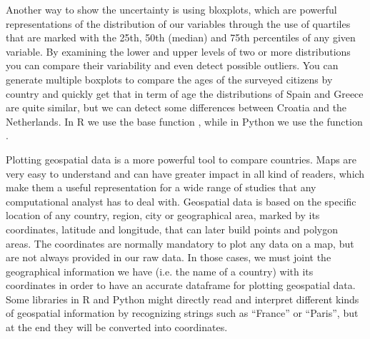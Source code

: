 Another way to show the uncertainty is using bloxplots, which are powerful representations of the distribution of our variables through the use of quartiles that are marked with the 25th, 50th (median) and 75th percentiles of any given variable. By examining the lower and upper levels of two or more distributions you can compare their variability and even detect possible outliers. You can generate multiple boxplots to compare the ages of the surveyed citizens by country and quickly get that in term of age the distributions of Spain and Greece are quite similar, but we can detect some differences between Croatia and the Netherlands. In R we use the base function , while in Python we use the  function .


Plotting geospatial data is a more powerful tool to compare countries.  Maps are very easy to understand and can have greater impact in all kind of readers, which make them a useful representation for a wide range of studies that any computational analyst has to deal with. Geospatial data is based on the specific location of any country, region, city or geographical area, marked by its coordinates, latitude and longitude, that can later build points and polygon areas. The coordinates are normally mandatory to plot any data on a map, but are not always provided in our raw data. In those cases, we must joint the geographical information we have (i.e. the name of a country) with its coordinates in order to have an accurate dataframe for plotting geospatial data. Some libraries in R and Python might directly read and interpret different kinds of geospatial information by recognizing strings such as “France” or “Paris”, but at the end they will be converted into coordinates. 

